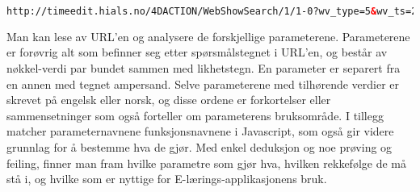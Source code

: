 \documentclass[../main.tex]{subfiles}
\begin{document}
\begin{lstlisting}[language=HTML, frame=single, caption={En URL generert når man søker etter en timeplan for ett spesifikt fag}]
http://timeedit.hials.no/4DACTION/WebShowSearch/1/1-0?wv_type=5&wv_ts=20130511T191704X3729&wv_search=&wv_startWeek=1301&wv_stopWeek=1318&wv_first=0&wv_addObj=&wv_delObj=&wv_obj1=174000&wv_text=Tekstformat
\end{lstlisting}

Man kan lese av URL’en og analysere de forskjellige parameterene. Parameterene er forøvrig alt som befinner seg etter spørsmålstegnet i URL'en, og består av nøkkel-verdi par bundet sammen med likhetstegn. En parameter er separert fra en annen med tegnet ampersand. Selve parameterene med tilhørende verdier er skrevet på engelsk eller norsk, og disse ordene er forkortelser eller sammensetninger som også forteller om parameterens bruksområde.  I tillegg matcher parameternavnene funksjonsnavnene i Javascript, som også gir videre grunnlag for å bestemme hva de gjør. Med enkel deduksjon og noe prøving og feiling, finner man fram hvilke parametre som gjør hva, hvilken rekkefølge de må stå i, og hvilke som er nyttige for E-lærings-applikasjonens bruk.
\end{document}
